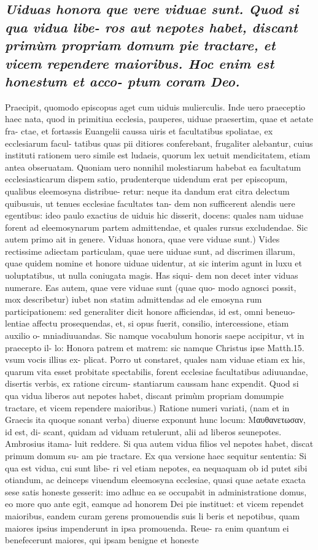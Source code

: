 \documentclass{article}
\begin{document}
\begin{pages}
\subsection*{\textit{Uiduas honora que vere viduae sunt. Quod si qua vidua libe- ros aut nepotes habet, discant primùm propriam domum pie tractare, et vicem rependere maioribus. Hoc enim est honestum et acco- ptum coram Deo. }}\pstart Praecipit, quomodo episcopus aget cum uiduis mulierculis. Inde uero praeceptio haec nata, quod in primitiua ecclesia, pauperes, uiduae praesertim, quae et aetate fra- ctae, et fortassis Euangelii caussa uiris et facultatibus spoliatae, ex ecclesiarum facul- tatibus quas pii ditiores conferebant, frugaliter alebantur, cuius instituti rationem uero simile est ludaeis, quorum lex uetuit mendicitatem, etiam antea obseruatam. Quoniam uero nonnihil molestiarum habebat ea facultatum ecclesiasticarum dispem satio, prudenterque uidendum erat per episcopum, qualibus eleemosyna distribue- retur: neque ita dandum erat citra delectum quibusuis, ut tenues ecclesiae facultates tan- dem non sufficerent alendis uere egentibus: ideo paulo exactius de uiduis hic disserit, docens: quales nam uiduae forent ad eleemosynarum partem admittendae, et quales rursus excludendae. Sic autem primo ait in genere.  \pend\pstart Viduas honora, quae vere viduae sunt.) Vides rectissime adiectam particulam, quae uere uiduae sunt, ad discrimen illarum, quae quidem nomine et honore uiduae uidentur, at sic interim agunt in luxu et uoluptatibus, ut nulla coniugata magis. Has siqui- dem non decet inter viduas numerare. Eas autem, quae vere viduae sunt (quae quo- modo agnosci possit, mox describetur) iubet non statim admittendas ad ele emosyna rum participationem: sed generaliter dicit honore afficiendas, id est, omni beneuo- lentiae affectu prosequendas, et, si opus fuerit, consilio, intercessione, etiam auxilio o- mniadiuuandas. Sic namque vocabulum honoris saepe accipitur, vt in praecepto il- lo: Honora patrem et matrem: sic namque Christus ipse Matth.15. vsum vocis illius ex- plicat. Porro ut constaret, quales nam viduae etiam ex his, quarum vita esset probitate spectabilis, forent ecclesiae facultatibus adiuuandae, disertis verbis, ex ratione circum- stantiarum caussam hanc expendit.  \pend\pstart Quod si qua vidua liberos aut nepotes habet, discant primùm propriam domumpie tractare, et vicem rependere maioribus.) Ratione numeri variati, (nam et in Graecis ita quoque sonant verba) diuerse exponunt hunc locum: Μαυθανετωσαν, id est, di- scant, quidam ad viduam retulerunt, alii ad liberos seunepotes. Ambrosius itama- luit reddere. Si qua autem vidua filios vel nepotes habet, discat primum domum su- am pie tractare. Ex qua versione haec sequitur sententia: Si qua est vidua, cui sunt libe- ri vel etiam nepotes, ea nequaquam ob id putet sibi otiandum, ac deinceps viuendum eleemosyna ecclesiae, quasi quae aetate exacta sese satis honeste gesserit: imo adhuc ea se occupabit in administratione domus, eo more quo ante egit, eamque ad honorem Dei pie instituet: et vicem rependet maioribus, eandem curam gerens promouendis suis li beris et nepotibus, quam maiores ipsius impenderunt in ipsa promouenda. Reue- ra enim quantum ei benefecerunt maiores, qui ipsam benigne et honeste 
\end{pages}
\end{document}

